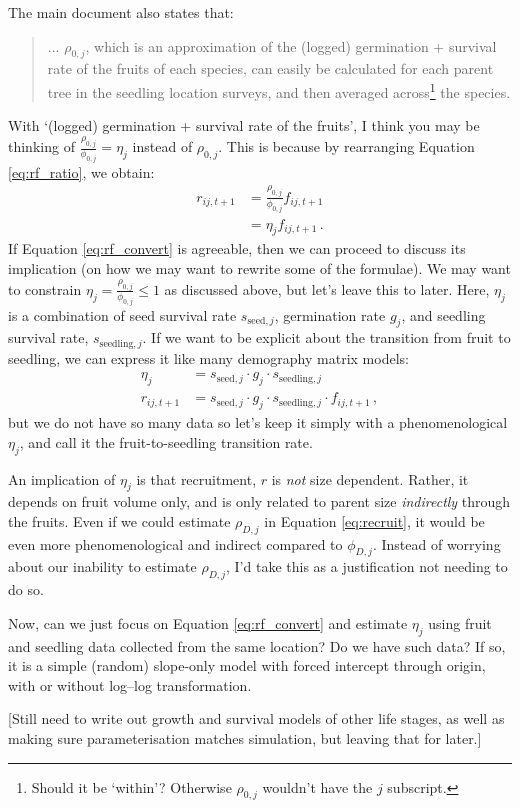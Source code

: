 \documentclass[12pt,a4paper]{article}
\begin{document}
The main document also states that:
\begin{quote}
... $\rho_{0,j}$, which is an approximation of the (logged) germination + survival rate of the fruits of each species, can easily be calculated for each parent tree in the seedling location surveys, and then averaged across\footnote{Should it be `within'? Otherwise $\rho_{0,j}$ wouldn't have the $j$ subscript.} the species.
\end{quote}
With `(logged) germination + survival rate of the fruits', I think you may be thinking of $\frac{\rho_{0,j}}{\phi_{0,j}} = \eta_j$ instead of $\rho_{0,j}$. This is because by rearranging Equation \ref{eq:rf_ratio}, we obtain:
\begin{align}
r_{ij,t+1} &= \frac{\rho_{0,j}}{\phi_{0,j}} f_{ij,t+1} \\
&= \eta_j f_{ij,t+1} \label{eq:rf_convert} \,.
\end{align}
If Equation \ref{eq:rf_convert} is agreeable, then we can proceed to discuss its implication (on how we may want to rewrite some of the formulae). We may want to constrain $\eta_j = \frac{\rho_{0,j}}{\phi_{0,j}} \le 1$ as discussed above, but let's leave this to later. Here, $\eta_j$ is a combination of seed survival rate $s_{\text{seed},j}$, germination rate $g_{j}$, and seedling survival rate, $s_{\text{seedling},j}$. If we want to be explicit about the transition from fruit to seedling, we can express it like many demography matrix models:
\begin{align*}
\eta_j &= s_{\text{seed},j} \cdot g_{j} \cdot s_{\text{seedling},j} \\
r_{ij,t+1} &= s_{\text{seed},j} \cdot g_{j} \cdot s_{\text{seedling},j} \cdot f_{ij,t+1} \,,
\end{align*}
but we do not have so many data so let's keep it simply with a phenomenological $\eta_j$, and call it the fruit-to-seedling transition rate.

An implication of $\eta_j$ is that recruitment, $r$ is \textit{not} size dependent. Rather, it depends on fruit volume only, and is only related to parent size \textit{indirectly} through the fruits. Even if we could estimate $\rho_{D,j}$ in Equation \ref{eq:recruit}, it would be even more phenomenological and indirect compared to $\phi_{D,j}$. Instead of worrying about our inability to estimate $\rho_{D,j}$, I'd take this as a justification not needing to do so.

Now, can we just focus on Equation \ref{eq:rf_convert} and estimate $\eta_j$ using fruit and seedling data collected from the same location? Do we have such data? If so, it is a simple (random) slope-only model with forced intercept through origin, with or without log--log transformation.

[Still need to write out growth and survival models of other life stages, as well as making sure parameterisation matches simulation, but leaving that for later.]
\end{document}
